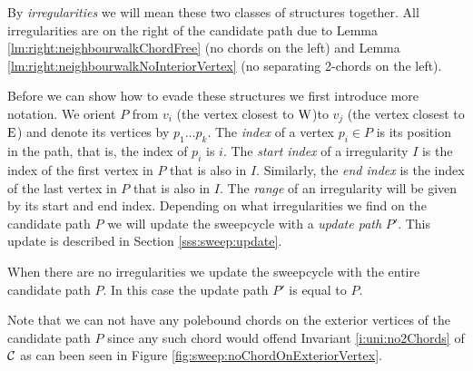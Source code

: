   By \emph{irregularities} we will mean these two classes of structures together.
  All irregularities are on the right of the candidate path due to Lemma \ref{lm:right:neighbourwalkChordFree} (no chords on the left) and Lemma \ref{lm:right:neighbourwalkNoInteriorVertex} (no separating 2-chords on the left).

  Before we can show how to evade these structures we first introduce more notation. We orient $P$ from $v_i$ (the vertex closest to $\mathrm{W}$)to $v_j$ (the vertex closest to $\mathrm{E}$) and denote its vertices by $p_1 \ldots p_k$.
  The \emph{index} of a vertex $p_i \in P$ is its position in the path, that is, the index of $p_i$ is $i$.
  The \emph{start index} of a irregularity $I$ is the index of the first vertex in $P$ that is also in $I$. Similarly, the \emph{end index} is the index of the last vertex in $P$ that is also in $I$.
  The \emph{range} of an irregularity will be given by its start and end index. Depending on what irregularities we find on the candidate path $P$ we will update the sweepcycle with a \emph{update path} $P'$. This update is described in Section \ref{sss:sweep:update}.

    When there are no irregularities we update the sweepcycle with the entire candidate path $P$.
    In this case the update path $P'$ is equal to $P$.

    Note that we can not have any polebound chords on the exterior vertices of the candidate path $P$ since any such chord would offend Invariant \ref{i:uni:no2Chords} of $\mathcal{C}$ as can been seen in Figure \ref{fig:sweep:noChordOnExteriorVertex}.

